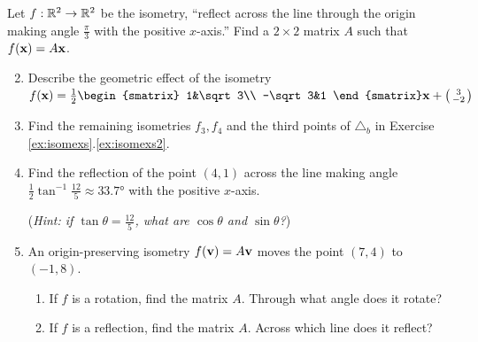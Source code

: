 \goodbreak



\begin{exercises}
\exstart Let $f:\mathbb{R}^2\to\mathbb{R}^2$ be the isometry, ``reflect across the line through the origin making angle $\frac\pi 3$ with the positive $x$-axis.'' Find a $2\times 2$ matrix $A$ such that $f({\mathbf{x}})=A{\mathbf{x}}$.
\begin{enumerate}\setcounter{enumi}{1}  
  \item Describe the geometric effect of the isometry $f(\vx)=\frac 12\begin{smatrix}
  1&\sqrt 3\\
  -\sqrt 3&1
  \end{smatrix}\vx+\stwovec 3{-2}$ 
  
  


	\item Find the remaining isometries $f_3,f_4$ and the third points of $\triangle_b$ in Exercise \ref*{ex:isomexs}.\ref{ex:isomexs2}.
	
	
	\item Find the reflection of the point $(4,1)$ across the line making angle $\frac 12\tan^{-1}\frac{12}5\approx \ang{33.7}$ with the positive $x$-axis.\par
	(\emph{Hint: if $\tan\theta=\frac{12}5$, what are $\cos\theta$ and $\sin\theta$?})
	
  
  \item An origin-preserving isometry $f({\mathbf{v}})=A{\mathbf{v}}$ moves the point $(7,4)$ to $(-1,8)$.
  \begin{enumerate}
    \item If $f$ is a rotation, find the matrix $A$. Through what angle does it rotate?
    \item If $f$ is a reflection, find the matrix $A$. Across which line does it reflect?
  \end{enumerate}
  

\end{enumerate}
\end{exercises}

